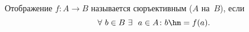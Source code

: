 
    Отображение $f\colon A\to B$ называется сюръективным ($A$ на~$B$), если 
    \[\forall\  b\in B\ \exists\ \ a\in A\colon b\hm=f(a).\]
